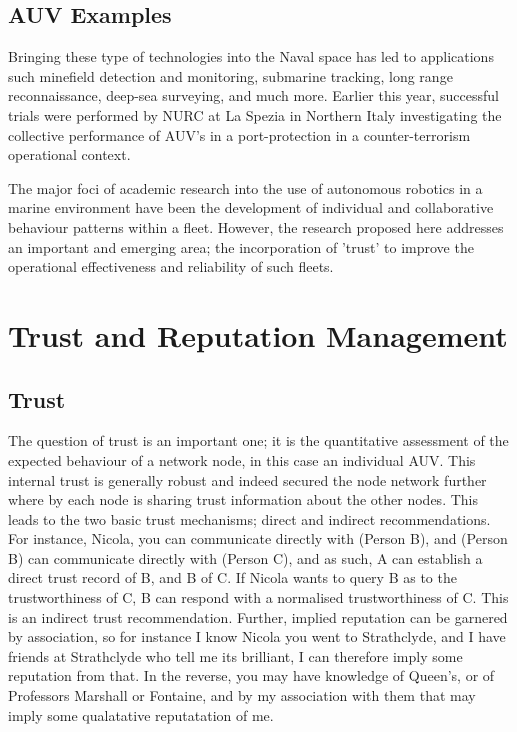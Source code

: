\documentclass[oneside,9pt,a4paper]{Latex/Classes/PhDthesisPSnPDF}
\begin{document}
\subsection{AUV Examples}  Bringing these type of technologies into the Naval space has
led to applications such minefield detection and monitoring, submarine tracking,
long range reconnaissance, deep-sea surveying, and much more. Earlier this year,
successful trials were performed by NURC at La Spezia in Northern Italy
investigating the collective performance of AUV's in a port-protection in a
counter-terrorism operational context.

The major foci of academic research into the use of autonomous robotics in a
marine environment have been the development of individual and collaborative
behaviour patterns within a fleet. However, the research proposed here addresses
an important and emerging area; the incorporation of 'trust' to improve the
operational effectiveness and reliability of such fleets.

\section{Trust and Reputation Management}
\subsection{Trust}  The question of trust is an important one; it is the quantitative
assessment of the expected behaviour of a network node, in this case an
individual AUV. This internal trust is generally robust and indeed secured the
node network further where by each node is sharing trust information about the
other nodes. This leads to the two basic trust mechanisms; direct and indirect
recommendations. For instance, Nicola, you can communicate directly with (Person
B), and (Person B) can communicate directly with (Person C), and as such, A can
establish a direct trust record of B, and B of C. If Nicola wants to query B as
to the trustworthiness of C, B can respond with a normalised trustworthiness of
C. This is an indirect trust recommendation. Further, implied reputation can be
garnered by association, so for instance I know Nicola you went to Strathclyde,
and I have friends at Strathclyde who tell me its brilliant, I can therefore
imply some reputation from that. In the reverse, you may have knowledge of
Queen's, or of Professors Marshall or Fontaine, and by my association with them
that may imply some qualatative reputatation of me.
\end{document}
